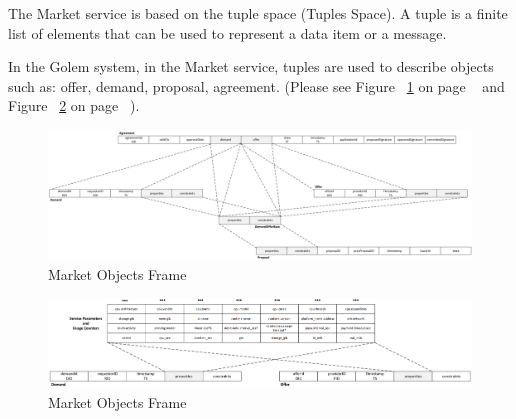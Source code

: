 The Market service is based on the tuple space (Tuples Space).
A tuple is a finite list of elements that can be used to represent a data item or a message.

In the Golem system, in the Market service, tuples are used to describe objects such as:
offer, demand, proposal, agreement. (Please see Figure ~\ref{fig:MF1} on page ~\pageref{fig:MF1}
and Figure ~\ref{fig:MF2} on page ~\pageref{fig:MF2}).

\begin{figure}[H]
    \centering
    \includegraphics[width=18cm,angle=0]{./diag/Reference/MarketFrame-1-Reference.png}
	\caption{Market Objects Frame}
    \label{fig:MF1}
\end{figure}


\begin{figure}[H]
    \centering
    \includegraphics[width=16cm,angle=0]{./diag/Reference/MarketFrame-2-Reference.png}
	\caption{Market Objects Frame}
    \label{fig:MF2}
\end{figure}

